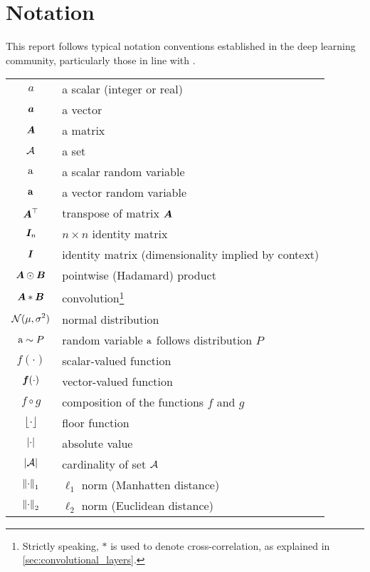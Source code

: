 \documentclass[../report.tex]{subfiles}
\begin{document}
\chapter*{Notation}

This report follows typical notation conventions established in the deep learning community, particularly those in line with \textcite{goodfellow2016}.

\bigskip
\noindent
\begin{tabular}{cl}
    $\displaystyle a$ & a scalar (integer or real)\\
    $\displaystyle {\bm{a}}$ & a vector\\
    $\displaystyle {\bm{A}}$ & a matrix\\
    $\displaystyle {\mathcal{A}}$ & a set\\
    $\displaystyle {\textnormal{a}}$ & a scalar random variable\\
    $\displaystyle {\mathbf{a}}$ & a vector random variable\\
    $\displaystyle {\bm{A}}^\top$ & transpose of matrix ${\bm{A}}$\\
    $\displaystyle {\bm{I}}_n$ & $n \times n$ identity matrix\\
    $\displaystyle {\bm{I}}$ & identity matrix (dimensionality implied by context)\\
    $\displaystyle {\bm{A}} \odot {\bm{B}}$ & pointwise (Hadamard) product\\
    $\displaystyle {\bm{A}} * {\bm{B}}$ & convolution\footnote{Strictly speaking, $*$ is used to denote cross-correlation, as explained in \cref{sec:convolutional_layers}.}\\
    $\displaystyle \mathcal{N}(\mu,\sigma^2)$ & normal distribution\\
    $\displaystyle {\textnormal{a}} \sim P$ & random variable ${\textnormal{a}}$ follows distribution $P$\\
    $\displaystyle f(\cdot)$ & scalar-valued function\\
    $\displaystyle {\bm{f}}(\cdot)$ & vector-valued function\\
    $\displaystyle f \circ g$ & composition of the functions $f$ and $g$\\
    $\displaystyle \lfloor\cdot\rfloor$ & floor function\\
    $\displaystyle \lvert\cdot\rvert$ & absolute value\\
    $\displaystyle \lvert{\mathcal{A}}\rvert$ & cardinality of set ${\mathcal{A}}$\\
    $\displaystyle \left\lVert\cdot\right\rVert_1$ & $\ell_1$ norm (Manhatten distance)\\
    $\displaystyle \left\lVert\cdot\right\rVert_2$ & $\ell_2$ norm (Euclidean distance)\\

\end{tabular}
\end{document}
